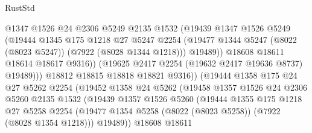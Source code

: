 \begin{lexlean}{RustStd}
\begin{coremodule}
                                @1347
                                @1526
                                @24
                                @2306
                                @5249
                                @2135
                                @1532
                                (@19439
                                  @1347
                                  @1526
                                  @5249
                                  (@19444
                                    @1345
                                    @175
                                    @1218
                                    @27
                                    @5247
                                    @2254
                                    (@19477
                                      @1344
                                      @5247
                                      (@8022 (@8023 @5247))
                                      (@7922 (@8028 @1344 @1218)))
                                    @19489))
                                @18608
                                @18611
                                @18614
                                @18617
                                @9316))
                            (@19625 @2417 @2254 (@19632 @2417 @19636 @8737) @19489)))
                        @18812
                        @18815
                        @18818
                        @18821
                        @9316))
                    (@19444
                      @1358
                      @175
                      @24
                      @27
                      @5262
                      @2254
                      (@19452
                        @1358
                        @24
                        @5262
                        (@19458
                          @1357
                          @1526
                          @24
                          @2306
                          @5260
                          @2135
                          @1532
                          (@19439
                            @1357
                            @1526
                            @5260
                            (@19444
                              @1355
                              @175
                              @1218
                              @27
                              @5258
                              @2254
                              (@19477 @1354 @5258 (@8022 (@8023 @5258)) (@7922 (@8028 @1354 @1218)))
                              @19489))
                          @18608
                          @18611

\end{coremodule}
\end{lexlean}

